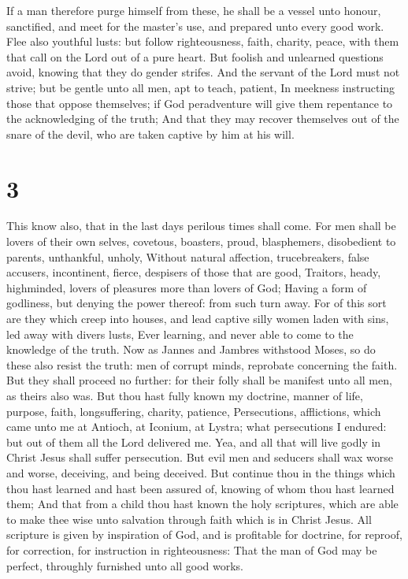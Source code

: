  If a man therefore purge himself from these, he shall be
a vessel unto honour, sanctified, and meet for the master's use, and
prepared unto every good work.  Flee also youthful lusts:
but follow righteousness, faith, charity, peace, with them that call on
the Lord out of a pure heart.  But foolish and unlearned
questions avoid, knowing that they do gender strifes. 
And the servant of the Lord must not strive; but be gentle unto all men,
apt to teach, patient,  In meekness instructing those
that oppose themselves; if God peradventure will give them repentance to
the acknowledging of the truth;  And that they may
recover themselves out of the snare of the devil, who are taken captive
by him at his will.

\hypertarget{section-2}{%
\section{3}\label{section-2}}

 This know also, that in the last days perilous times
shall come.  For men shall be lovers of their own selves,
covetous, boasters, proud, blasphemers, disobedient to parents,
unthankful, unholy,  Without natural affection,
trucebreakers, false accusers, incontinent, fierce, despisers of those
that are good,  Traitors, heady, highminded, lovers of
pleasures more than lovers of God;  Having a form of
godliness, but denying the power thereof: from such turn away.
 For of this sort are they which creep into houses, and
lead captive silly women laden with sins, led away with divers lusts,
 Ever learning, and never able to come to the knowledge of
the truth.  Now as Jannes and Jambres withstood Moses, so
do these also resist the truth: men of corrupt minds, reprobate
concerning the faith.  But they shall proceed no further:
for their folly shall be manifest unto all men, as theirs also was.
 But thou hast fully known my doctrine, manner of life,
purpose, faith, longsuffering, charity, patience, 
Persecutions, afflictions, which came unto me at Antioch, at Iconium, at
Lystra; what persecutions I endured: but out of them all the Lord
delivered me.  Yea, and all that will live godly in
Christ Jesus shall suffer persecution.  But evil men and
seducers shall wax worse and worse, deceiving, and being deceived.
 But continue thou in the things which thou hast learned
and hast been assured of, knowing of whom thou hast learned them;
 And that from a child thou hast known the holy
scriptures, which are able to make thee wise unto salvation through
faith which is in Christ Jesus.  All scripture is given
by inspiration of God, and is profitable for doctrine, for reproof, for
correction, for instruction in righteousness:  That the
man of God may be perfect, throughly furnished unto all good works.

